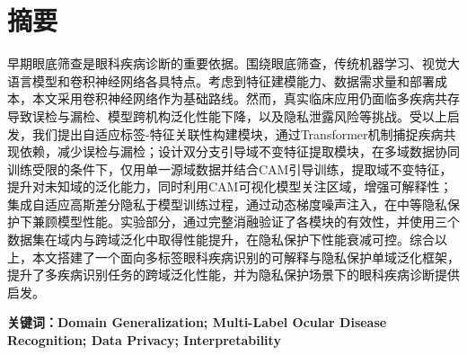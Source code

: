 \section*{摘要}\label{ux6458ux8981}

早期眼底筛查是眼科疾病诊断的重要依据。围绕眼底筛查，传统机器学习、视觉大语言模型和卷积神经网络各具特点。考虑到特征建模能力、数据需求量和部署成本，本文采用卷积神经网络作为基础路线。然而，真实临床应用仍面临多疾病共存导致误检与漏检、模型跨机构泛化性能下降，以及隐私泄露风险等挑战。受以上启发，我们提出自适应标签-特征关联性构建模块，通过Transformer机制捕捉疾病共现依赖，减少误检与漏检；设计双分支引导域不变特征提取模块，在多域数据协同训练受限的条件下，仅用单一源域数据并结合CAM引导训练，提取域不变特征，提升对未知域的泛化能力，同时利用CAM可视化模型关注区域，增强可解释性；集成自适应高斯差分隐私于模型训练过程，通过动态梯度噪声注入，在中等隐私保护下兼顾模型性能。实验部分，通过完整消融验证了各模块的有效性，并使用三个数据集在域内与跨域泛化中取得性能提升，在隐私保护下性能衰减可控。综合以上，本文搭建了一个面向多标签眼科疾病识别的可解释与隐私保护单域泛化框架，提升了多疾病识别任务的跨域泛化性能，并为隐私保护场景下的眼科疾病诊断提供启发。

\noindent\textbf{关键词：}\textbf{Domain Generalization; Multi-Label Ocular Disease Recognition; Data Privacy; Interpretability}
